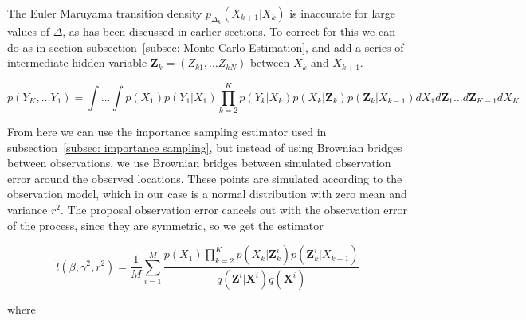 The Euler Maruyama transition density $p_{\Delta_k}(X_{k+1}|X_k)$ is inaccurate for large values of $\Delta$, as has been discussed in earlier sections. To correct for this we can do as in section subsection~\ref{subsec: Monte-Carlo Estimation}, and add a series of intermediate hidden variable $\textbf{Z}_k = (Z_{k1}, \dots Z_{kN})$ between $X_k$ and $X_{k+1}$. 

$$
p(Y_K,\dots Y_1) = \int \dots \int  p(X_1)p(Y_1|X_1)\prod_{k=2}^K p(Y_k |X_k)p(X_k| \textbf{Z}_k)p(\textbf{Z}_k |X_{k-1}) dX_1d\textbf{Z}_1 \dots d\textbf{Z}_{K-1} dX_K 
$$

From here we can use the importance sampling estimator used in subsection~\ref{subsec: importance sampling}, but instead of using Brownian bridges between observations, we use Brownian bridges between simulated observation error around the observed locations. These points are simulated according to the observation model, which in our case is a normal distribution with zero mean and variance $r^2$. The proposal observation error cancels out with the observation error of the process, since they are symmetric, so we get the estimator

$$
\hat{l}(\beta, \gamma^2, r^2) =\frac{1}{M} \sum_{i = 1}^M  \frac{p(X_1)\prod_{k=2}^K p(X_k| \textbf{Z}_k^i)p(\textbf{Z}_k^i |X_{k-1})}{q(\textbf{Z}^i|\textbf{X}^i) q(\textbf{X}^i)}
$$

where $$


